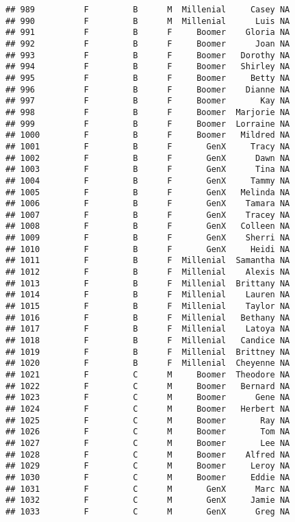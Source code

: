 \documentclass[
]{article}
\begin{document}
\begin{verbatim}
## 989          F         B      M  Millenial     Casey NA
## 990          F         B      M  Millenial      Luis NA
## 991          F         B      F     Boomer    Gloria NA
## 992          F         B      F     Boomer      Joan NA
## 993          F         B      F     Boomer   Dorothy NA
## 994          F         B      F     Boomer   Shirley NA
## 995          F         B      F     Boomer     Betty NA
## 996          F         B      F     Boomer    Dianne NA
## 997          F         B      F     Boomer       Kay NA
## 998          F         B      F     Boomer  Marjorie NA
## 999          F         B      F     Boomer  Lorraine NA
## 1000         F         B      F     Boomer   Mildred NA
## 1001         F         B      F       GenX     Tracy NA
## 1002         F         B      F       GenX      Dawn NA
## 1003         F         B      F       GenX      Tina NA
## 1004         F         B      F       GenX     Tammy NA
## 1005         F         B      F       GenX   Melinda NA
## 1006         F         B      F       GenX    Tamara NA
## 1007         F         B      F       GenX    Tracey NA
## 1008         F         B      F       GenX   Colleen NA
## 1009         F         B      F       GenX    Sherri NA
## 1010         F         B      F       GenX     Heidi NA
## 1011         F         B      F  Millenial  Samantha NA
## 1012         F         B      F  Millenial    Alexis NA
## 1013         F         B      F  Millenial  Brittany NA
## 1014         F         B      F  Millenial    Lauren NA
## 1015         F         B      F  Millenial    Taylor NA
## 1016         F         B      F  Millenial   Bethany NA
## 1017         F         B      F  Millenial    Latoya NA
## 1018         F         B      F  Millenial   Candice NA
## 1019         F         B      F  Millenial  Brittney NA
## 1020         F         B      F  Millenial  Cheyenne NA
## 1021         F         C      M     Boomer  Theodore NA
## 1022         F         C      M     Boomer   Bernard NA
## 1023         F         C      M     Boomer      Gene NA
## 1024         F         C      M     Boomer   Herbert NA
## 1025         F         C      M     Boomer       Ray NA
## 1026         F         C      M     Boomer       Tom NA
## 1027         F         C      M     Boomer       Lee NA
## 1028         F         C      M     Boomer    Alfred NA
## 1029         F         C      M     Boomer     Leroy NA
## 1030         F         C      M     Boomer     Eddie NA
## 1031         F         C      M       GenX      Marc NA
## 1032         F         C      M       GenX     Jamie NA
## 1033         F         C      M       GenX      Greg NA

\end{verbatim}
\end{document}

